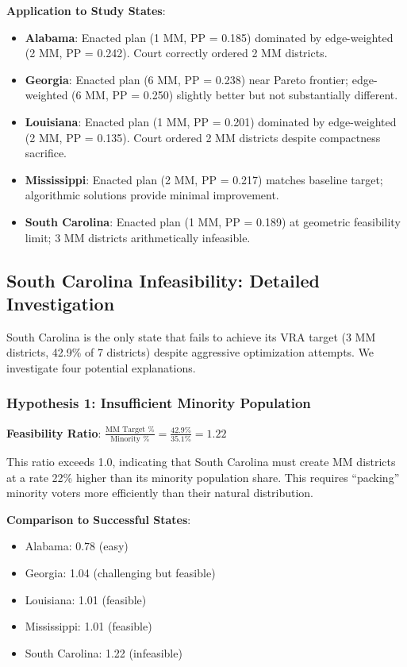 \textbf{Application to Study States}:
\begin{itemize}
    \item \textbf{Alabama}: Enacted plan (1 MM, PP = 0.185) dominated by edge-weighted (2 MM, PP = 0.242). Court correctly ordered 2 MM districts.
    \item \textbf{Georgia}: Enacted plan (6 MM, PP = 0.238) near Pareto frontier; edge-weighted (6 MM, PP = 0.250) slightly better but not substantially different.
    \item \textbf{Louisiana}: Enacted plan (1 MM, PP = 0.201) dominated by edge-weighted (2 MM, PP = 0.135). Court ordered 2 MM districts despite compactness sacrifice.
    \item \textbf{Mississippi}: Enacted plan (2 MM, PP = 0.217) matches baseline target; algorithmic solutions provide minimal improvement.
    \item \textbf{South Carolina}: Enacted plan (1 MM, PP = 0.189) at geometric feasibility limit; 3 MM districts arithmetically infeasible.
\end{itemize}

\subsection{South Carolina Infeasibility: Detailed Investigation}

South Carolina is the only state that fails to achieve its VRA target (3 MM districts, 42.9\% of 7 districts) despite aggressive optimization attempts. We investigate four potential explanations.

\subsubsection{Hypothesis 1: Insufficient Minority Population}

\textbf{Feasibility Ratio}: $\frac{\text{MM Target \%}}{\text{Minority \%}} = \frac{42.9\%}{35.1\%} = 1.22$

This ratio exceeds 1.0, indicating that South Carolina must create MM districts at a rate 22\% higher than its minority population share. This requires ``packing'' minority voters more efficiently than their natural distribution.

\textbf{Comparison to Successful States}:
\begin{itemize}
    \item Alabama: 0.78 (easy)
    \item Georgia: 1.04 (challenging but feasible)
    \item Louisiana: 1.01 (feasible)
    \item Mississippi: 1.01 (feasible)
    \item South Carolina: 1.22 (infeasible)
\end{itemize}

